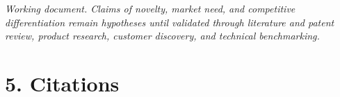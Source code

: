 \documentclass[12pt,letterpaper]{article}
\begin{document}
\vfill
\footnotesize\textit{Working document. Claims of novelty, market need, and competitive differentiation remain hypotheses until validated through literature and patent review, product research, customer discovery, and technical benchmarking.}
\newpage
\section*{5. Citations}
\printbibliography[heading=none]
\end{document}
